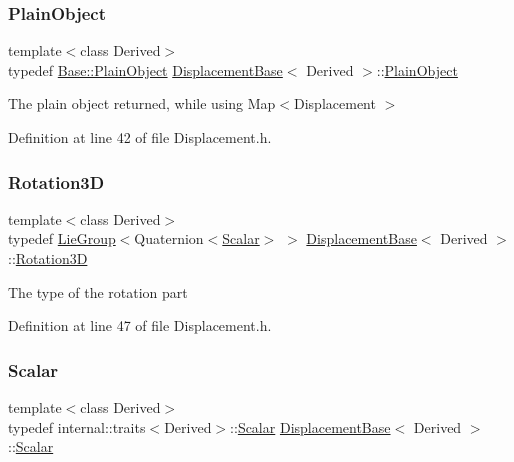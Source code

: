 \subsubsection{\texorpdfstring{Plain\+Object}{PlainObject}}
{\footnotesize\ttfamily template$<$class Derived$>$ \\
typedef \hyperlink{class_lie_group_base_a37b1d64048a2fa65b298801f6028c468}{Base\+::\+Plain\+Object} \hyperlink{class_displacement_base}{Displacement\+Base}$<$ Derived $>$\+::\hyperlink{class_displacement_base_aaa66ea6d4bdfcd9ca5fbfafbc66e78b9}{Plain\+Object}}

The plain object returned, while using Map$<$\+Displacement $>$ 

Definition at line 42 of file Displacement.\+h.

\hypertarget{class_displacement_base_aca59ea9e7f5fb3b67a489726bced7f4f}{}\label{class_displacement_base_aca59ea9e7f5fb3b67a489726bced7f4f} 
\subsubsection{\texorpdfstring{Rotation3D}{Rotation3D}}
{\footnotesize\ttfamily template$<$class Derived$>$ \\
typedef \hyperlink{class_lie_group}{Lie\+Group}$<$Quaternion$<$\hyperlink{class_displacement_base_a978caf313131fd9d221a856a2e4a80ad}{Scalar}$>$ $>$ \hyperlink{class_displacement_base}{Displacement\+Base}$<$ Derived $>$\+::\hyperlink{class_displacement_base_aca59ea9e7f5fb3b67a489726bced7f4f}{Rotation3D}}

The type of the rotation part 

Definition at line 47 of file Displacement.\+h.

\hypertarget{class_displacement_base_a978caf313131fd9d221a856a2e4a80ad}{}\label{class_displacement_base_a978caf313131fd9d221a856a2e4a80ad} 
\subsubsection{\texorpdfstring{Scalar}{Scalar}}
{\footnotesize\ttfamily template$<$class Derived$>$ \\
typedef internal\+::traits$<$Derived$>$\+::\hyperlink{class_displacement_base_a978caf313131fd9d221a856a2e4a80ad}{Scalar} \hyperlink{class_displacement_base}{Displacement\+Base}$<$ Derived $>$\+::\hyperlink{class_displacement_base_a978caf313131fd9d221a856a2e4a80ad}{Scalar}}

